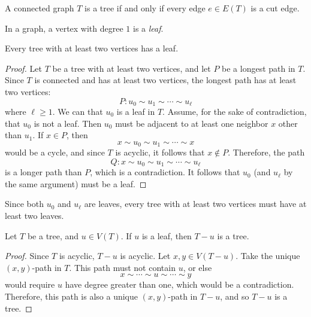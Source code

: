 \documentclass[12pt]{article}
\begin{document}
\begin{thm}\label{tree-cute-edges}
    A connected graph $T$ is a tree if and only if every edge $e \in E(T)$ is a cut edge.
\end{thm}

\begin{defn}
    In a graph, a vertex with degree $1$ is a \emph{leaf}.
\end{defn}

\begin{thm}\label{tree-has-leaf}
    Every tree with at least two vertices has a leaf.
\end{thm}

\begin{proof}
    Let $T$ be a tree with at least two vertices, and let $P$ be a longest path in $T$. Since $T$ is connected and has at least two vertices, the longest path has at least two vertices:
    \[P: u_0 \sim u_1 \sim \cdots \sim u_{\ell}\] where $\ell \geq 1$. We can that $u_0$ is a leaf in $T$. Assume, for the sake of contradiction, that $u_0$ is not a leaf. Then $u_0$ must be adjacent to at least one neighbor $x$ other than $u_1$. If $x \in P$, then
    \[x \sim u_0 \sim u_1 \sim \cdots \sim x\] would be a cycle, and since $T$ is acyclic, it follows that $x \notin P$. Therefore, the path
    \[Q: x \sim u_0 \sim u_1 \sim \cdots \sim u_{\ell}\] is a longer path than $P$, which is a contradiction. It follows that $u_0$ (and $u_{\ell}$ by the same argument) must be a leaf.
\end{proof}

\begin{rmk}
    Since both $u_0$ and $u_{\ell}$ are leaves, every tree with at least two vertices must have at least two leaves.
\end{rmk}

\begin{prop}\label{tree-minus-leaf}
    Let $T$ be a tree, and $u \in V(T)$. If $u$ is a leaf, then $T - u$ is a tree.
\end{prop}

\begin{proof}
    Since $T$ is acyclic, $T - u$ is acyclic. Let $x, y \in V(T - u)$. Take the unique $(x, y)$-path in $T$. This path must not contain $u$, or else
    \[x \sim \cdots \sim u \sim \cdots \sim y\] would require $u$ have degree greater than one, which would be a contradiction. Therefore, this path is also a unique $(x, y)$-path in $T - u$, and so $T - u$ is a tree.
\end{proof}
\end{document}
